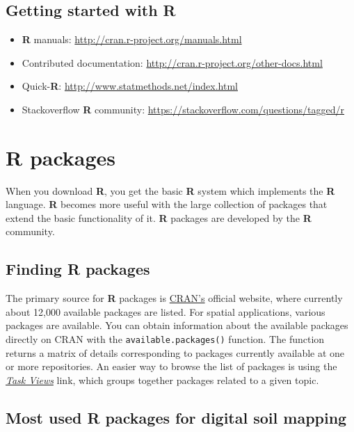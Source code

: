 \documentclass[
  10pt,
  b5paper,
  oneside]{book}
\providecommand{\tightlist}{%
  \setlength{\itemsep}{0pt}\setlength{\parskip}{0pt}}
\theoremstyle{definition}
\theoremstyle{definition}
\theoremstyle{definition}
\theoremstyle{definition}
\theoremstyle{remark}
\begin{document}
\hypertarget{getting-started-with-r}{%
\subsection{Getting started with R}\label{getting-started-with-r}}

\begin{itemize}
\tightlist
\item
  \textbf{R} manuals: \url{http://cran.r-project.org/manuals.html}
\item
  Contributed documentation: \url{http://cran.r-project.org/other-docs.html}
\item
  Quick-\textbf{R}: \url{http://www.statmethods.net/index.html}
\item
  Stackoverflow \textbf{R} community: \url{https://stackoverflow.com/questions/tagged/r}
\end{itemize}

\hypertarget{r-packages}{%
\section{R packages}\label{r-packages}}

When you download \textbf{R}, you get the basic \textbf{R} system which implements the \textbf{R} language. \textbf{R} becomes more useful with the large collection of packages that extend the basic functionality of it. \textbf{R} packages are developed by the \textbf{R} community.

\hypertarget{finding-r-packages}{%
\subsection{Finding R packages}\label{finding-r-packages}}

The primary source for \textbf{R} packages is \href{https://cran.r-project.org/}{CRAN's} official website, where currently about 12,000 available packages are listed. For spatial applications, various packages are available. You can obtain information about the available packages directly on CRAN with the \texttt{available.packages()} function. The function returns a matrix of details corresponding to packages currently available at one or more repositories. An easier way to browse the list of packages is using the \href{https://cran.r-project.org/web/views/}{\emph{Task Views}} link, which groups together packages related to a given topic.

\hypertarget{most-used-r-packages-for-digital-soil-mapping}{%
\subsection{Most used R packages for digital soil mapping}\label{most-used-r-packages-for-digital-soil-mapping}}
\end{document}
